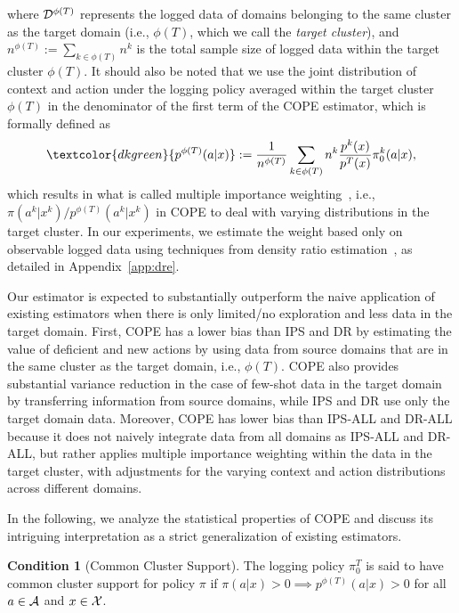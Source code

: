\documentclass{article} %
\theoremstyle{definition}
\newtheorem{assum}{Condition}[section]
\begin{document}
where $\mathcal{D}^{\phi(T)}$ represents the logged data of domains belonging to the same cluster as the target domain (i.e., $\phi(T)$, which we call the \textit{target cluster}), and $n^{\phi(T)}:=\sum_{k \in \phi(T)}n^{k}$ is the total sample size of logged data within the target cluster $\phi(T)$. 
It should also be noted that we use the joint distribution of context and action under the logging policy averaged within the target cluster $\phi(T)$ in the denominator of the first term of the COPE estimator, which is formally defined as
\begin{align}
    \textcolor{dkgreen}{p^{\phi(T)}(a|x)} := \frac{1}{n^{\phi(T)}}\sum_{k \in \phi(T)}n^{k} \frac{p^{k}(x)}{p^{T}(x)}\pi_0^{k}(a|x), \label{eq:average-iw}
\end{align}
which results in what is called multiple importance weighting~\citep{owen2013monte,agarwal2017effective}, i.e., $\pi(a^{k}|x^{k}) /  p^{\phi(T)}(a^{k}|x^{k})$ in COPE to deal with varying distributions in the target cluster. In our experiments, we estimate the weight based only on observable logged data using techniques from density ratio estimation~\citep{sugiyama2012density,kanamori2012statistical}, as detailed in Appendix~\ref{app:dre}.

Our estimator is expected to substantially outperform the naive application of existing estimators when there is only limited/no exploration and less data in the target domain. First, COPE has a lower bias than IPS and DR by estimating the value of deficient and new actions by using data from source domains that are in the same cluster as the target domain, i.e., $\phi(T)$. COPE also provides substantial variance reduction in the case of few-shot data in the target domain by transferring information from source domains, while IPS and DR use only the target domain data. Moreover, COPE has lower bias than IPS-ALL and DR-ALL because it does not naively integrate data from all domains as IPS-ALL and DR-ALL, but rather applies multiple importance weighting within the data in the target cluster, with adjustments for the varying context and action distributions across different domains.

In the following, we analyze the statistical properties of COPE and discuss its intriguing interpretation as a strict generalization of existing estimators. 

\begin{assum}[Common Cluster Support]
\label{ass:common-cluster-support}
The logging policy $\pi_0^T$ is said to have common cluster support for policy $\pi$ if $\pi(a|x) > 0 \implies p^{\phi(T)}(a|x) > 0$ for all $a \in \mathcal{A}$ and $x \in \mathcal{X}$.
\end{assum}
\end{document}

